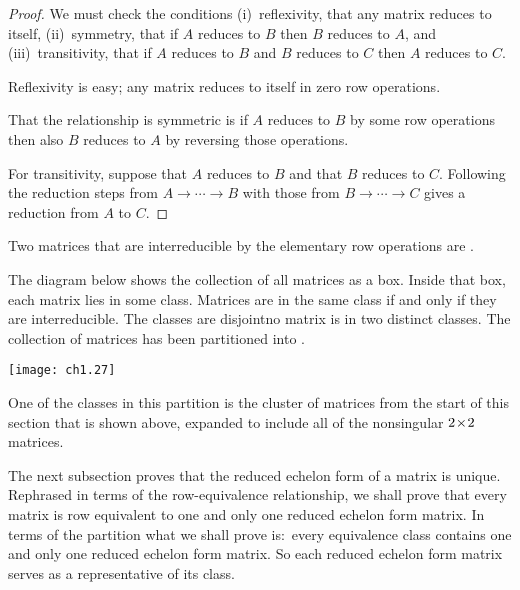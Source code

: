 \begin{proof}
We must check the conditions
(i)~reflexivity, that any matrix reduces to itself,
(ii)~symmetry, that if \( A \) reduces to \( B \) then
   \( B \) reduces to \( A \),
and (iii)~transitivity, that if \( A \) reduces to \( B \) and
      \( B \) reduces to \( C \) then \( A \) reduces to
      \( C \).

Reflexivity is easy; any  matrix reduces to itself in zero row operations.

That the relationship is symmetric is \Dash if
\( A \) reduces to \( B \) by some row operations
then also \( B \) reduces to \( A \) by reversing those operations.

For transitivity, suppose that \( A \) reduces to \( B \) and
that \( B \) reduces to \( C \).
Following the reduction steps from $A \rightarrow\cdots\rightarrow B$
with those from  $B \rightarrow\cdots\rightarrow C$ 
gives a reduction from \( A \) to \( C \).
\end{proof}

\begin{definition}
Two matrices that are interreducible by the elementary row operations
are .%
\end{definition}

The diagram below shows the collection of all matrices as a box.
Inside that box, each matrix lies in some class.
Matrices are in the same class if and only if they are interreducible.
The classes are disjoint\Dash no matrix is in two distinct classes.
The collection of matrices has been partitioned into 
.

\begin{center}
  \texttt{[image: ch1.27]}
\end{center}
\noindent One of the classes in this partition is the
cluster of matrices from the start of this section that is shown above,
expanded to include all of the nonsingular $2 \! \times \! 2$ matrices. 

The next subsection proves that the reduced echelon form of a matrix is 
unique.
Rephrased in terms of the row-equivalence relationship, 
we shall prove that every matrix is 
row equivalent to one and only one reduced echelon form matrix.
In terms of the partition what we shall prove is:~every
equivalence class contains one and only one reduced echelon form matrix.
So each reduced echelon form matrix serves as a representative of its 
class.

